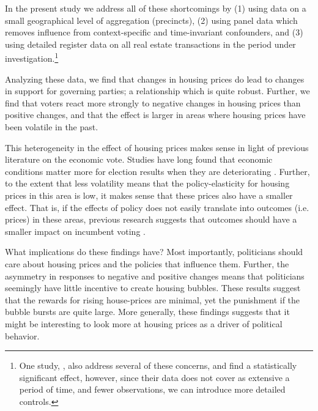 \documentclass[12pt,a4paper]{article}
\begin{document}
In the present study we address all of these shortcomings by (1) using data on a small geographical level of aggregation (precincts), (2) using panel data which removes influence from context-specific and time-invariant confounders, and (3) using detailed register data on all real estate transactions in the period under investigation.\footnote{One study, \cite{healy2014presidential}, also address several of these concerns, and find a statistically significant effect, however, since their data does not cover as extensive a period of time, and fewer observations, we can introduce more detailed controls.} 

Analyzing these data, we find that changes in housing prices do lead to changes in support for governing parties; a relationship which is quite robust. Further, we find that voters react more strongly to negative changes in housing prices than positive changes, and that the effect is larger in areas where housing prices have been volatile in the past. 

This heterogeneity in the effect of housing prices makes sense in light of previous literature on the economic vote. Studies have long found that economic conditions matter more for election results when they are deteriorating \citep[e.g.][]{bloom1975voter,headrick1991attention,nannestad1997grievance,olsen2015negativity}. Further, to the extent that less volatility means that the policy-elasticity for housing prices in this area is low, it makes sense that these prices also have a smaller effect. That is, if the effects of policy does not easily translate into outcomes (i.e. prices) in these areas, previous research suggests that outcomes should have a smaller impact on incumbent voting \citep{duch2008economic}.

What implications do these findings have? Most importantly, politicians should care about housing prices and the policies that influence them.  Further, the asymmetry in responses to negative and positive changes means that politicians seemingly have little incentive to create housing bubbles. These results suggest that the rewards for rising house-prices are minimal, yet the punishment if the bubble bursts are quite large. More generally, these findings suggests that it might be interesting to look more at housing prices as a driver of political behavior.
\end{document}

